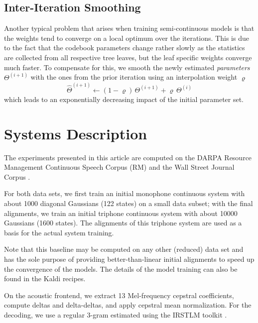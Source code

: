 \documentclass{article}
\begin{document}
\subsection{Inter-Iteration Smoothing}
Another typical problem that arises when training semi-continuous models is
that the weights tend to converge on a local optimum over the iterations. 
This is due to the fact that the codebook parameters change rather slowly 
as the statistics are collected from all respective tree leaves, but the 
leaf specific weights converge much faster.
%
To compensate for this, we smooth the newly estimated {\em parameters} 
$\Theta^{(i+1)}$ with the ones from the prior iteration using an interpolation
weight $\varrho$
\begin{equation}
\hat\Theta^{(i+1)} \leftarrow (1 - \varrho) \, \Theta^{(i+1)} + \varrho \, \Theta^{(i)} %
\end{equation}
which leads to an exponentially decreasing impact of the initial parameter set.


\section{Systems Description}
The experiments presented in this article are computed on the DARPA Resource 
Management Continuous Speech Corpus (RM) \cite{price1993rm} and the Wall Street
Journal Corpus \cite{garofalo2007wsj}.

For both data sets, we first train an initial monophone continuous system
with about 1000 diagonal Gaussians (122 states) on a small data subset; with 
the final alignments, we train an initial triphone continuous system with 
about 10000 Gaussians (1600 states).  The alignments of this triphone system
are used as a basis for the actual system training.

Note that this baseline may be computed on any other (reduced) data set
and has the sole purpose of providing better-than-linear initial alignments
to speed up the convergence of the models.
%
The details of the model training can also be found in the {\sc Kaldi} recipes.

On the acoustic frontend, we extract 13 Mel-frequency cepstral coefficients,
compute deltas and delta-deltas, and apply cepstral mean normalization. For
the decoding, we use a regular 3-gram estimated using the IRSTLM toolkit 
\cite{federico2008iao}.
\end{document}

